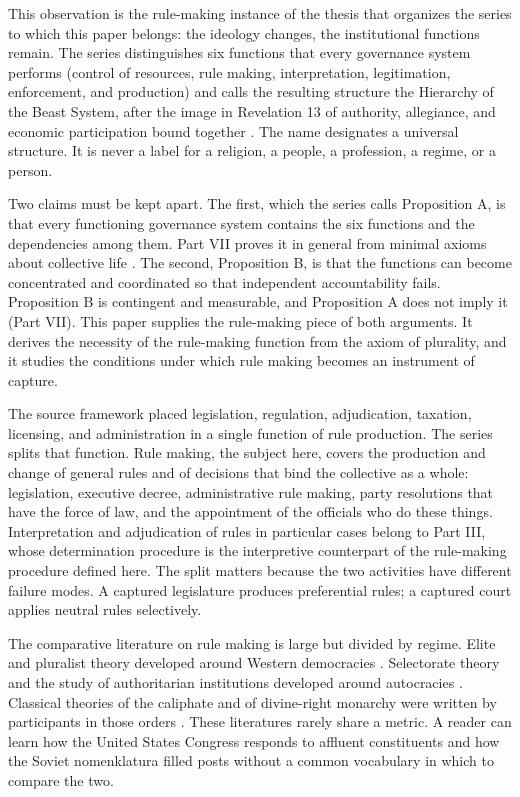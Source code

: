 \documentclass[11pt,letterpaper]{article}
\theoremstyle{definition}
\theoremstyle{remark}
\begin{document}
This observation is the rule-making instance of the thesis that organizes the series to which this paper belongs: the ideology changes, the institutional functions remain. The series distinguishes six functions that every governance system performs (control of resources, rule making, interpretation, legitimation, enforcement, and production) and calls the resulting structure the Hierarchy of the Beast System, after the image in Revelation 13 of authority, allegiance, and economic participation bound together \citep{largo2026hbs}. The name designates a universal structure. It is never a label for a religion, a people, a profession, a regime, or a person.

Two claims must be kept apart. The first, which the series calls Proposition A, is that every functioning governance system contains the six functions and the dependencies among them. Part VII proves it in general from minimal axioms about collective life \citep{long2026formalized}. The second, Proposition B, is that the functions can become concentrated and coordinated so that independent accountability fails. Proposition B is contingent and measurable, and Proposition A does not imply it (Part VII). This paper supplies the rule-making piece of both arguments. It derives the necessity of the rule-making function from the axiom of plurality, and it studies the conditions under which rule making becomes an instrument of capture.

The source framework \citep{largo2026hbs} placed legislation, regulation, adjudication, taxation, licensing, and administration in a single function of rule production. The series splits that function. Rule making, the subject here, covers the production and change of general rules and of decisions that bind the collective as a whole: legislation, executive decree, administrative rule making, party resolutions that have the force of law, and the appointment of the officials who do these things. Interpretation and adjudication of rules in particular cases belong to Part III, whose determination procedure \citep[Definition~2.3]{long2026judicial} is the interpretive counterpart of the rule-making procedure defined here. The split matters because the two activities have different failure modes. A captured legislature produces preferential rules; a captured court applies neutral rules selectively.

The comparative literature on rule making is large but divided by regime. Elite and pluralist theory developed around Western democracies \citep{mosca1939,michels1915,dahl1961,mills1956}. Selectorate theory and the study of authoritarian institutions developed around autocracies \citep{bdm2003,svolik2012,gandhi2007}. Classical theories of the caliphate and of divine-right monarchy were written by participants in those orders \citep{mawardi1996,bodin1992,bossuet1990}. These literatures rarely share a metric. A reader can learn how the United States Congress responds to affluent constituents \citep{bartels2008,gilens2014} and how the Soviet nomenklatura filled posts \citep{hough1979,voslensky1984} without a common vocabulary in which to compare the two.
\end{document}
